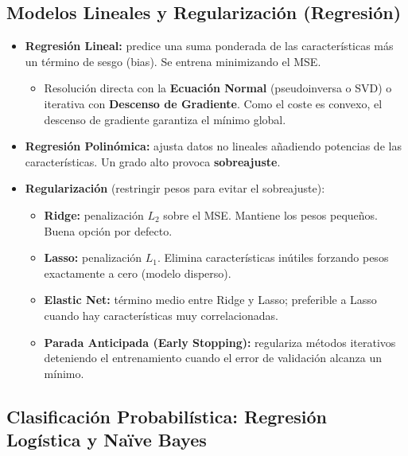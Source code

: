 \documentclass[12pt]{book} %
\providecommand{\tightlist}{%
  \setlength{\itemsep}{0pt}\setlength{\parskip}{0pt}}
\begin{document}
\hypertarget{modelos-lineales-y-regularizaciuxf3n-regresiuxf3n}{%
\subsection{Modelos Lineales y Regularización
(Regresión)}\label{modelos-lineales-y-regularizaciuxf3n-regresiuxf3n}}

\begin{itemize}
\tightlist
\item
  \textbf{Regresión Lineal:} predice una suma ponderada de las
  características más un término de sesgo (bias). Se entrena minimizando
  el MSE.

  \begin{itemize}
  \tightlist
  \item
    Resolución directa con la \textbf{Ecuación Normal} (pseudoinversa o
    SVD) o iterativa con \textbf{Descenso de Gradiente}. Como el coste
    es convexo, el descenso de gradiente garantiza el mínimo global.
  \end{itemize}
\item
  \textbf{Regresión Polinómica:} ajusta datos no lineales añadiendo
  potencias de las características. Un grado alto provoca
  \textbf{sobreajuste}.
\item
  \textbf{Regularización} (restringir pesos para evitar el sobreajuste):

  \begin{itemize}
  \tightlist
  \item
    \textbf{Ridge:} penalización \(L_2\) sobre el MSE. Mantiene los
    pesos pequeños. Buena opción por defecto.
  \item
    \textbf{Lasso:} penalización \(L_1\). Elimina características
    inútiles forzando pesos exactamente a cero (modelo disperso).
  \item
    \textbf{Elastic Net:} término medio entre Ridge y Lasso; preferible
    a Lasso cuando hay características muy correlacionadas.
  \item
    \textbf{Parada Anticipada (Early Stopping):} regulariza métodos
    iterativos deteniendo el entrenamiento cuando el error de validación
    alcanza un mínimo.
  \end{itemize}
\end{itemize}

\hypertarget{clasificaciuxf3n-probabiluxedstica-regresiuxf3n-loguxedstica-y-nauxefve-bayes}{%
\subsection{Clasificación Probabilística: Regresión Logística y Naïve
Bayes}\label{clasificaciuxf3n-probabiluxedstica-regresiuxf3n-loguxedstica-y-nauxefve-bayes}}
\end{document}

